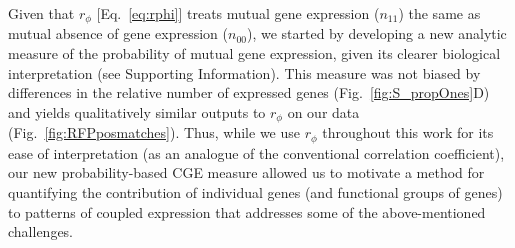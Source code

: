 \documentclass[10pt,letterpaper]{article}
\begin{document}
Given that $r_\phi$ [Eq.~\ref{eq:rphi}] treats mutual gene expression ($n_{11}$) the same as mutual absence of gene expression ($n_{00}$), we started by developing a new analytic measure of the probability of mutual gene expression, given its clearer biological interpretation (see Supporting Information).
This measure was not biased by differences in the relative number of expressed genes (Fig.~\ref{fig:S_propOnes}D) and yields qualitatively similar outputs to $r_\phi$ on our data (Fig.~\ref{fig:RFPposmatches}).
Thus, while we use $r_\phi$ throughout this work for its ease of interpretation (as an analogue of the conventional correlation coefficient), our new probability-based CGE measure allowed us to motivate a method for quantifying the contribution of individual genes (and functional groups of genes) to patterns of coupled expression that addresses some of the above-mentioned challenges.
\end{document}
